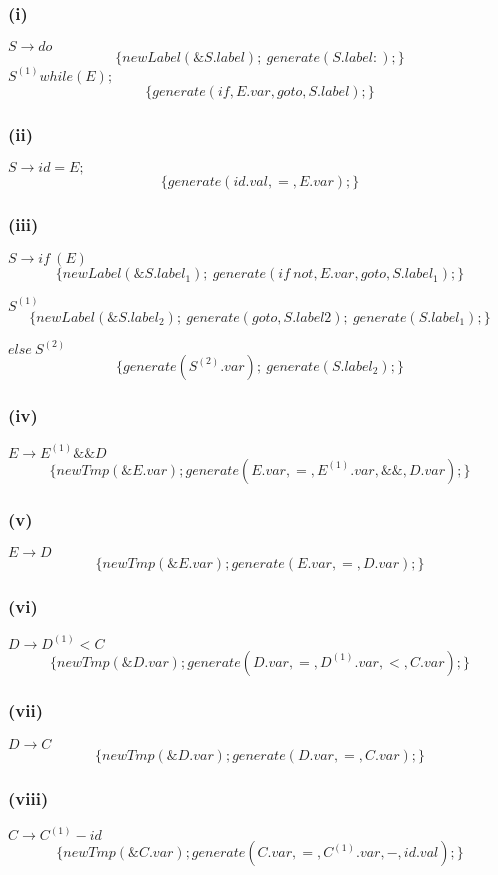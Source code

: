 \documentclass[a4paper,10pt]{jsarticle}
\begin{document}
\subsubsection*{(i)}
$S\rightarrow do$
\[\{newLabel(\&S.label);\
  generate(S.label:);\}\]
$S^{(1)}while(E);$
\[\{generate(if, E.var, goto, S.label);\}\]

\subsubsection*{(ii)}
$S\rightarrow id=E;$
\[\{generate(id.val, =, E.var);\}\]

\subsubsection*{(iii)}
$S\rightarrow if\ (E)$
\[\{newLabel(\&S.label_1);\
  generate(if\ not, E.var, goto, S.label_1);\}\]

$S^{(1)}$
\[\{newLabel(\&S.label_2);\
  generate(goto, S.label2);\
  generate(S.label_1);\}\]

$else\ S^{(2)}$
\[\{generate(S^{(2)}.var);\
  generate(S.label_2);\}\]

\subsubsection*{(iv)}
$E\rightarrow E^{(1)}\&\&D$
\[\{newTmp(\&E.var);generate(E.var, = ,E^{(1)}.var, \&\&, D.var);\}\]

\subsubsection*{(v)}
$E\rightarrow D$
\[\{newTmp(\&E.var);generate(E.var, =, D.var);\}\]

\subsubsection*{(vi)}
$D\rightarrow D^{(1)}<C$
\[\{newTmp(\&D.var);generate(D.var, =, D^{(1)}.var, <, C.var);\}\]

\subsubsection*{(vii)}
$D\rightarrow C$
\[\{newTmp(\&D.var);generate(D.var, =, C.var);\}\]

\subsubsection*{(viii)}
$C\rightarrow C^{(1)}-id$
\[\{newTmp(\&C.var);generate(C.var, =, C^{(1)}.var, -, id.val);\}\]
\end{document}
